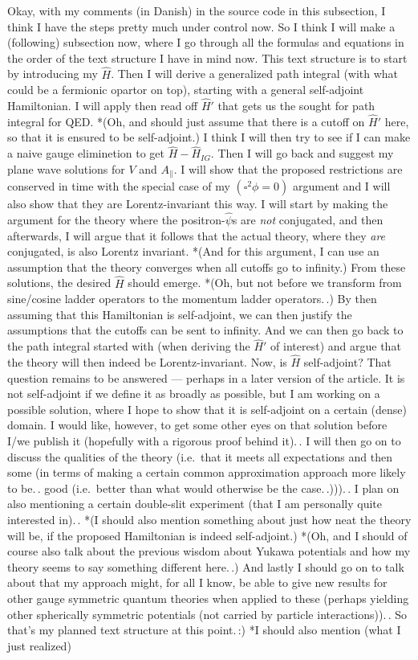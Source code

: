\documentclass{report}
\begin{document}
Okay, with my comments (in Danish) in the source code in this subsection, I think I have the steps pretty much under control now. So I think I will make a (following) subsection now, where I go through all the formulas and equations in the order of the text structure I have in mind now. This text structure is to start by introducing my $\hat H$. Then I will derive a generalized path integral (with what could be a fermionic opartor on top), starting with a general self-adjoint Hamiltonian. I will apply then read off $\hat H'$ that gets us the sought for path integral for QED. *(Oh, and should just assume that there is a cutoff on $\hat H'$ here, so that it is ensured to be self-adjoint.) I think I will then try to see if I can make a naive gauge eliminetion to get $\hat H - \hat H_{I G}$. Then I will go back and suggest my plane wave solutions for $V$ and $A_\parallel$. I will show that the proposed restrictions are conserved in time with the special case of my $(\square^2\phi = 0)$ argument and I will also show that they are Lorentz-invariant this way. I will start by making the argument for the theory where the positron-$\hat\psi$s are \emph{not} conjugated, and then afterwards, I will argue that it follows that the actual theory, where they \emph{are} conjugated, is also Lorentz invariant. *(And for this argument, I can use an assumption that the theory converges when all cutoffs go to infinity.) From these solutions, the desired $\hat H$ should emerge. *(Oh, but not before we transform from sine/cosine ladder operators to the momentum ladder operators.\,.) By then assuming that this Hamiltonian is self-adjoint, we can then justify the assumptions that the cutoffs can be sent to infinity. And we can then go back to the path integral started with (when deriving the $\hat H'$ of interest) and argue that the theory will then indeed be Lorentz-invariant. Now, is $\hat H$ self-adjoint? That question remains to be answered --- perhaps in a later version of the article. It is not self-adjoint if we define it as broadly as possible, but I am working on a possible solution, where I hope to show that it is self-adjoint on a certain (dense) domain. I would like, however, to get some other eyes on that solution before I/we publish it (hopefully with a rigorous proof behind it).\,. I will then go on to discuss the qualities of the theory (i.e.\ that it meets all expectations and then some (in terms of making a certain common approximation approach more likely to be.\,. good (i.e.\ better than what would otherwise be the case.\,.))).\,. I plan on also mentioning a certain double-slit experiment (that I am personally quite interested in).\,. *(I should also mention something about just how neat the theory will be, if the proposed Hamiltonian is indeed self-adjoint.) *(Oh, and I should of course also talk about the previous wisdom about Yukawa potentials and how my theory seems to say something different here.\,.) And lastly I should go on to talk about that my approach might, for all I know, be able to give new results for other gauge symmetric quantum theories when applied to these (perhaps yielding other spherically symmetric potentials (not carried by particle interactions)).\,. So that's my planned text structure at this point.\,:) *I should also mention (what I just realized) %
\end{document}
